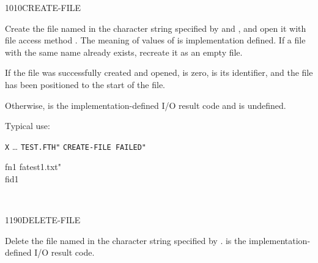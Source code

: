 \begin{worddef}{1010}{CREATE-FILE}
\item {}

	Create the file named in the character string specified by
	 and , and open it with file access method
	. The meaning of values of  is
	implementation defined. If a file with the same name already
	exists, recreate it as an empty file.

	If the file was successfully created and opened,  is
	zero,  is its identifier, and the file has been
	positioned to the start of the file.

	Otherwise,  is the implementation-defined I/O result
	code and  is undefined.

\see {}

	\begin{rationale} %
		Typical use:

		\tab \word[core]{:} \texttt{X} {\ldots}
				 \texttt{TEST.FTH"} 
				 \texttt{CREATE-FILE FAILED"}
			\word[core]{;}
	\end{rationale}

	\begin{testing}\ttfamily
		\word{:} fn1  fatest1.txt" \word{;} \\
		 fid1

		 \\
	\end{testing}
\end{worddef}


\begin{worddef}{1190}{DELETE-FILE}
\item {}

	Delete the file named in the character string specified by
	.  is the implementation-defined
	I/O result code.

	\begin{testing}
		 \\
		 \\
	\end{testing}
\end{worddef}


